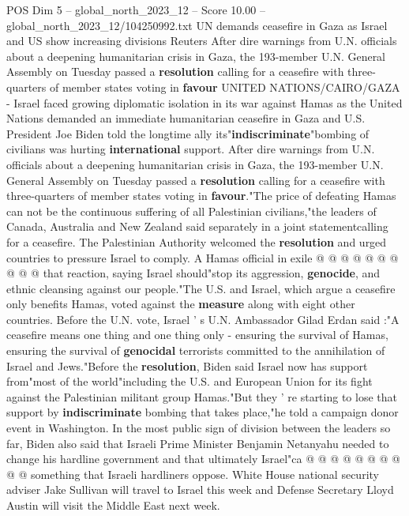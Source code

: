 \begin{textsample}{POS Dim 5 – global\_north\_2023\_12 – Score 10.00 – global\_north\_2023\_12/104250992.txt}  \label{ex:f5_pos_350}
UN demands ceasefire in Gaza as Israel and US show increasing divisions Reuters After dire warnings from U.N. officials about a deepening humanitarian crisis in Gaza, the 193-member U.N.
General Assembly on Tuesday passed a \textbf{resolution} calling for a ceasefire with three-quarters of member states voting in \textbf{favour} UNITED NATIONS/CAIRO/GAZA - Israel faced growing diplomatic isolation in its war against Hamas as the United Nations demanded an immediate humanitarian ceasefire in Gaza and U.S.
President Joe Biden told the longtime ally its"\textbf{indiscriminate}"bombing of civilians was hurting \textbf{international} support.
After dire warnings from U.N. officials about a deepening humanitarian crisis in Gaza, the 193-member U.N.
General Assembly on Tuesday passed a \textbf{resolution} calling for a ceasefire with three-quarters of member states voting in \textbf{favour}."The price of defeating Hamas can not be the continuous suffering of all Palestinian civilians,"the leaders of Canada, Australia and New Zealand said separately in a joint statementcalling for a ceasefire.
The Palestinian Authority welcomed the \textbf{resolution} and urged countries to pressure Israel to comply.
A Hamas official in exile @ @ @ @ @ @ @ @ @ @ that reaction, saying Israel should"stop its aggression, \textbf{genocide}, and ethnic cleansing against our people."The U.S. and Israel, which argue a ceasefire only benefits Hamas, voted against the \textbf{measure} along with eight other countries.
Before the U.N. vote, Israel ' s U.N.
Ambassador Gilad Erdan said :"A ceasefire means one thing and one thing only - ensuring the survival of Hamas, ensuring the survival of \textbf{genocidal} terrorists committed to the annihilation of Israel and Jews."Before the \textbf{resolution}, Biden said Israel now has support from"most of the world"including the U.S. and European Union for its fight against the Palestinian militant group Hamas."But they ' re starting to lose that support by \textbf{indiscriminate} bombing that takes place,"he told a campaign donor event in Washington.
In the most public sign of division between the leaders so far, Biden also said that Israeli Prime Minister Benjamin Netanyahu needed to change his hardline government and that ultimately Israel"ca @ @ @ @ @ @ @ @ @ @ something that Israeli hardliners oppose.
White House national security adviser Jake Sullivan will travel to Israel this week and Defense Secretary Lloyd Austin will visit the Middle East next week.

\end{textsample}

